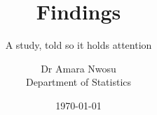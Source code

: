 \documentclass[aspectratio=169,11pt]{beamer}
\title{Findings}
\subtitle{A study, told so it holds attention}
\author{Dr Amara Nwosu \\ \small Department of Statistics}
\date{\today}
\begin{document}
\titleslide





\end{document}

